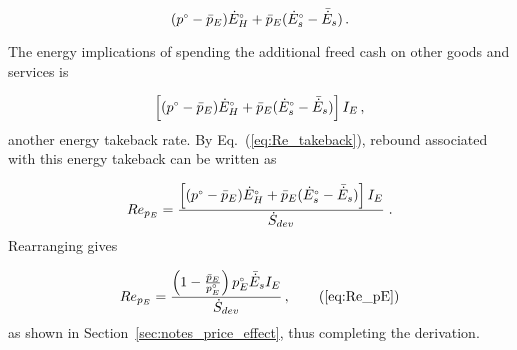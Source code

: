 \begin{equation}
  ({}{p}^{\scriptscriptstyle \circ} - \bar{p}_E) {}{\dot{E}}^{\scriptscriptstyle \circ}_H + \bar{p}_E ({}{\dot{E}}^{\scriptscriptstyle \circ}_s - \bar{\dot{E}}_s) \, .
\end{equation}

The energy implications of spending the additional freed cash
on other goods and services is

\begin{equation}
  \left[ ({}{p}^{\scriptscriptstyle \circ} - \bar{p}_E) {}{\dot{E}}^{\scriptscriptstyle \circ}_H + \bar{p}_E ({}{\dot{E}}^{\scriptscriptstyle \circ}_s - \bar{\dot{E}}_s) \right] I_E \, ,
\end{equation}
%
another energy takeback rate.
By Eq.~(\ref{eq:Re_takeback}),
rebound associated with this energy takeback
can be written as

\begin{equation}
  Re_{p_E} = \frac{\left[ ({}{p}^{\scriptscriptstyle \circ} - \bar{p}_E) {}{\dot{E}}^{\scriptscriptstyle \circ}_H + \bar{p}_E ({}{\dot{E}}^{\scriptscriptstyle \circ}_s - \bar{\dot{E}}_s) \right] I_E}{\dot{S}_{dev}} \; .
\end{equation}
%
Rearranging gives

\begin{equation}
  Re_{p_E} = \frac{\left(1 - \frac{\ainc{p}_E}{\bempl{p}_E}\right) \orig{p}_E \rainc{E}_s I_E}{\Sdot} \, ,  \tag{\ref{eq:Re_pE}}
\end{equation}
%
as shown in Section~\ref{sec:notes_price_effect},
thus completing the derivation.



